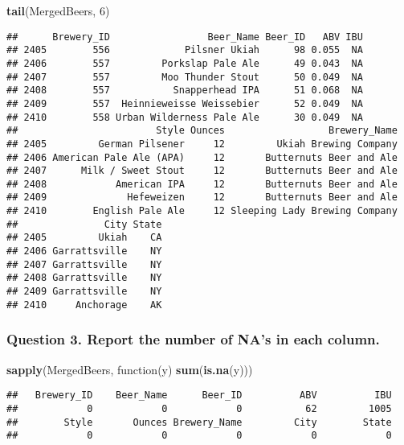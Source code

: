 \documentclass[]{article}
\newenvironment{Shaded}{\begin{snugshade}}{\end{snugshade}}
\newcommand{\KeywordTok}[1]{\textcolor[rgb]{0.13,0.29,0.53}{\textbf{{#1}}}}
\newcommand{\DecValTok}[1]{\textcolor[rgb]{0.00,0.00,0.81}{{#1}}}
\newcommand{\NormalTok}[1]{{#1}}
\begin{document}
\begin{Shaded}
\begin{Highlighting}[]
\KeywordTok{tail}\NormalTok{(MergedBeers, }\DecValTok{6}\NormalTok{)}
\end{Highlighting}
\end{Shaded}

\begin{verbatim}
##      Brewery_ID                 Beer_Name Beer_ID   ABV IBU
## 2405        556             Pilsner Ukiah      98 0.055  NA
## 2406        557         Porkslap Pale Ale      49 0.043  NA
## 2407        557         Moo Thunder Stout      50 0.049  NA
## 2408        557           Snapperhead IPA      51 0.068  NA
## 2409        557  Heinnieweisse Weissebier      52 0.049  NA
## 2410        558 Urban Wilderness Pale Ale      30 0.049  NA
##                        Style Ounces                  Brewery_Name
## 2405         German Pilsener     12         Ukiah Brewing Company
## 2406 American Pale Ale (APA)     12       Butternuts Beer and Ale
## 2407      Milk / Sweet Stout     12       Butternuts Beer and Ale
## 2408            American IPA     12       Butternuts Beer and Ale
## 2409              Hefeweizen     12       Butternuts Beer and Ale
## 2410        English Pale Ale     12 Sleeping Lady Brewing Company
##               City State
## 2405         Ukiah    CA
## 2406 Garrattsville    NY
## 2407 Garrattsville    NY
## 2408 Garrattsville    NY
## 2409 Garrattsville    NY
## 2410     Anchorage    AK
\end{verbatim}

\subsubsection{Question 3. Report the number of NA's in each
column.}\label{question-3.-report-the-number-of-nas-in-each-column.}

\begin{Shaded}
\begin{Highlighting}[]
\KeywordTok{sapply}\NormalTok{(MergedBeers, function(y) }\KeywordTok{sum}\NormalTok{(}\KeywordTok{is.na}\NormalTok{(y)))}
\end{Highlighting}
\end{Shaded}

\begin{verbatim}
##   Brewery_ID    Beer_Name      Beer_ID          ABV          IBU 
##            0            0            0           62         1005 
##        Style       Ounces Brewery_Name         City        State 
##            0            0            0            0            0
\end{verbatim}
\end{document}
